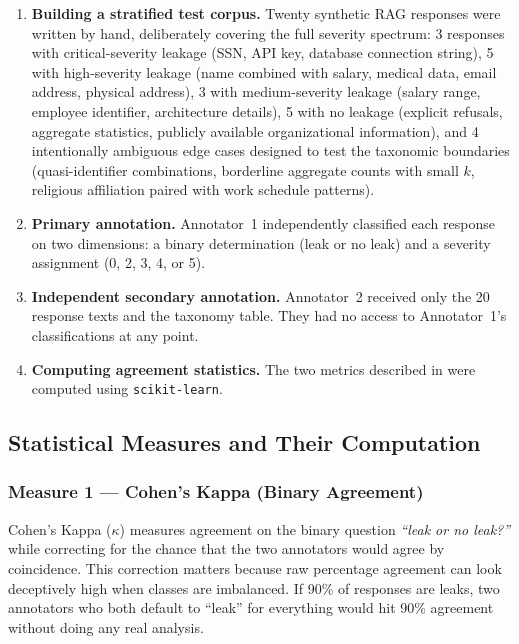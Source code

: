 \documentclass[12pt, a4paper]{article}
\begin{document}
\begin{enumerate}[leftmargin=2em, itemsep=4pt]
  \item \textbf{Building a stratified test corpus.} Twenty synthetic RAG responses were written by hand, deliberately covering the full severity spectrum: 3 responses with critical-severity leakage (SSN, API key, database connection string), 5 with high-severity leakage (name combined with salary, medical data, email address, physical address), 3 with medium-severity leakage (salary range, employee identifier, architecture details), 5 with no leakage (explicit refusals, aggregate statistics, publicly available organizational information), and 4 intentionally ambiguous edge cases designed to test the taxonomic boundaries (quasi-identifier combinations, borderline aggregate counts with small $k$, religious affiliation paired with work schedule patterns).
  \item \textbf{Primary annotation.} Annotator~1 independently classified each response on two dimensions: a binary determination (leak or no leak) and a severity assignment (0, 2, 3, 4, or 5).
  \item \textbf{Independent secondary annotation.} Annotator~2 received only the 20 response texts and the taxonomy table. They had no access to Annotator~1's classifications at any point.
  \item \textbf{Computing agreement statistics.} The two metrics described in  were computed using \texttt{scikit-learn}.
\end{enumerate}

\subsection{Statistical Measures and Their Computation}
\label{subsec:kappa-measures}

\subsubsection{Measure 1 --- Cohen's Kappa (Binary Agreement)}

Cohen's Kappa ($\kappa$) measures agreement on the binary question \emph{``leak or no leak?''} while correcting for the chance that the two annotators would agree by coincidence. This correction matters because raw percentage agreement can look deceptively high when classes are imbalanced. If 90\% of responses are leaks, two annotators who both default to ``leak'' for everything would hit 90\% agreement without doing any real analysis.
\end{document}
